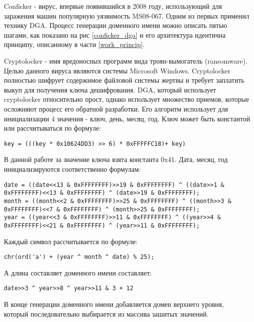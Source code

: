 Conficker - вирус, впервые появившийся в 2008 году, использующий для заражения машин популярную уязвимость MS08-067. Одним из первых применил технику DGA. Процесс генерации доменного имени можно описать пятью шагами, как показано на рис \ref{conficker_dga} и его архитектура идентична принципу, описанному в части \ref{work_princip}.

Cryptolocker - имя вредоносных программ вида троян-вымогатель (ransomware). Целью данного вируса являются системы Microsoft Windows. Cryptolocker полностью шифрует содержимое файловой системы жертвы и требует заплатить выкуп для получения ключа дешифрования.
DGA, который использует cryptolocker относительно прост, однако использует множество приемов, которые осложняют процесс его обратной разработки. Его алгоритм использует для инициализации 4 значения - ключ, день, месяц, год.
Ключ может быть константой или рассчитываться по формуле:
\begin{lstlisting}
key = (((key * 0x10624DD3) >> 6) * 0xFFFFFC18)+ key)
\end{lstlisting}
В данной работе за значение ключа взята константа 0x41.
Дата, месяц, год инициализируются соответственно формулам:
\begin{lstlisting}
date = ((date<<13 & 0xFFFFFFFF)>>19 & 0xFFFFFFFF) ^ ((date>>1 & 0xFFFFFFFF)<<13 & 0xFFFFFFFF) ^ (date>>19 & 0xFFFFFFFF);
month = ((month<<2 & 0xFFFFFFFF)>>25 & 0xFFFFFFFF) ^ ((month>>3 & 0xFFFFFFFF)<<7 & 0xFFFFFFFF) ^ (month>>25 & 0xFFFFFFFF);
year = ((year<<3 & 0xFFFFFFFF)>>11 & 0xFFFFFFFF) ^ ((year>>4 & 0xFFFFFFFF)<<21 & 0xFFFFFFFF) ^ (year>>11 & 0xFFFFFFFF);
\end{lstlisting}
Каждый символ рассчитывается по формуле:
\begin{lstlisting}
chr(ord('a') + (year ^ month ^ date) % 25);
\end{lstlisting}
А длина составляет доменного имени составляет:
\begin{lstlisting}
date>>3 ^ year>>8 ^ year>>11 & 3 + 12
\end{lstlisting}
В конце генерации доменного имени добавляется домен верхнего уровня, который последовательно выбирается из массива зашитых значений.

